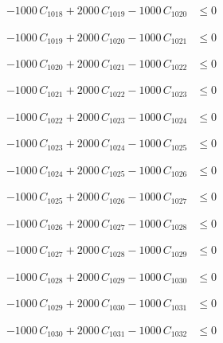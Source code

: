 \documentclass[a4paper,11pt]{article}
\begin{document}
\begin{align}
-1000\,C_{1018} + 2000\,C_{1019} - 1000\,C_{1020} &\leq 0 \nonumber
\end{align}

\begin{align}
-1000\,C_{1019} + 2000\,C_{1020} - 1000\,C_{1021} &\leq 0 \nonumber
\end{align}

\begin{align}
-1000\,C_{1020} + 2000\,C_{1021} - 1000\,C_{1022} &\leq 0 \nonumber
\end{align}

\begin{align}
-1000\,C_{1021} + 2000\,C_{1022} - 1000\,C_{1023} &\leq 0 \nonumber
\end{align}

\begin{align}
-1000\,C_{1022} + 2000\,C_{1023} - 1000\,C_{1024} &\leq 0 \nonumber
\end{align}

\begin{align}
-1000\,C_{1023} + 2000\,C_{1024} - 1000\,C_{1025} &\leq 0 \nonumber
\end{align}

\begin{align}
-1000\,C_{1024} + 2000\,C_{1025} - 1000\,C_{1026} &\leq 0 \nonumber
\end{align}

\begin{align}
-1000\,C_{1025} + 2000\,C_{1026} - 1000\,C_{1027} &\leq 0 \nonumber
\end{align}

\begin{align}
-1000\,C_{1026} + 2000\,C_{1027} - 1000\,C_{1028} &\leq 0 \nonumber
\end{align}

\begin{align}
-1000\,C_{1027} + 2000\,C_{1028} - 1000\,C_{1029} &\leq 0 \nonumber
\end{align}

\begin{align}
-1000\,C_{1028} + 2000\,C_{1029} - 1000\,C_{1030} &\leq 0 \nonumber
\end{align}

\begin{align}
-1000\,C_{1029} + 2000\,C_{1030} - 1000\,C_{1031} &\leq 0 \nonumber
\end{align}

\begin{align}
-1000\,C_{1030} + 2000\,C_{1031} - 1000\,C_{1032} &\leq 0 \nonumber
\end{align}
\end{document}
